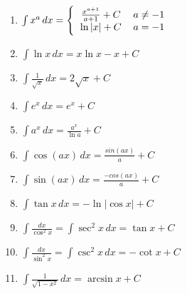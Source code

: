 \begin{center}
    \begin{small}
        \begin{enumerate}
            \item \begin{math}
                \int x^a\,dx =
                \Bigg\{\begin{tabular}{ccc}
                    $\frac{x^{a+1}}{a+1} + C$  & $a \neq -1$ & \\
                    $ \ln{\left|x\right|} + C$ & $a = -1$ & \\
                  \end{tabular}
            \end{math}
            \item \begin{math}
                \int \ln {x}\,dx = x \ln {x} - x + C
            \end{math}
            \item \begin{math}
                \int \frac {1}{\sqrt{x}}\,dx=2\sqrt{x} + C 
            \end{math}
            \item \begin{math}
                \int e^x\,dx = e^x + C
            \end{math}
            \item \begin{math}
                \int a^x\,dx = \frac{a^x}{\ln{a}} + C
            \end{math}
            \item \begin{math}
                \int \cos({ax}) \, dx = { \frac{sin (ax)}{a} } + C
            \end{math}
            \item \begin{math}
                \int \sin({ax}) \, dx = { \frac{-cos(ax)}{a} } + C
            \end{math}
            \item \begin{math}
                \int \tan{x} \, dx = -\ln{\left| \cos {x} \right|} + C
            \end{math}
            \item \begin{math}
                \int \frac{dx}{\cos^2 x}=\int \sec^2 x \, dx = \tan x + C
            \end{math}
            \item \begin{math}
                \int \frac{dx}{\sin^2 x}=\int \csc^2 x \, dx = -\cot x + C
            \end{math}
            \item \begin{math}
                \int {\frac{1}{\sqrt{1-x^2}}} \, dx = \arcsin {x} + C
            \end{math}
        \end{enumerate}
    \end{small}
\end{center}
